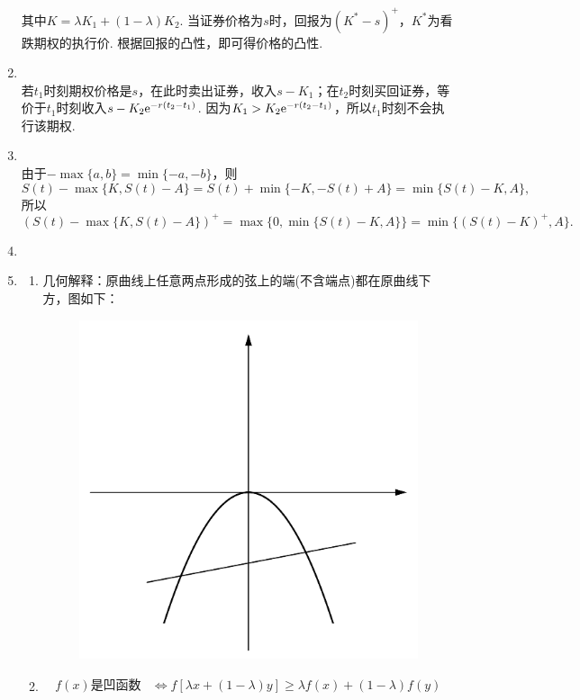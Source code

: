 \begin{enumerate}[label=\arabic{section}.\arabic*]
    其中$K=\lambda K_1+(1-\lambda)K_2$. 当证券价格为$s$时，回报为$(K^*-s)^+$，$K^*$为看跌期权的执行价. 根据回报的凸性，即可得价格的凸性.
    \item \pro\\
    若$t_1$时刻期权价格是$s$，在此时卖出证券，收入$s-K_1$；在$t_2$时刻买回证券，等价于$t_1$时刻收入$s-K_2\mathrm{e}^{-r(t_2-t_1)}$. 因为$K_1>K_2\mathrm{e}^{-r(t_2-t_1)}$，所以$t_1$时刻不会执行该期权.
    \item \pro\\
    由于$-\max\{a,b\}=\min\{-a,-b\}$，则
    \[S(t)-\max\{K,S(t)-A\}=S(t)+\min\{-K,-S(t)+A\}=\min\{S(t)-K,A\},\]
    所以\[(S(t)-\max\{K,S(t)-A\})^+=\max\{0,\min\{S(t)-K,A\}\}=\min\{(S(t)-K)^+,A\}.\]
    \item \omitted
    \item \sol
    \begin{enumerate}[label=\alph*)]
        \item 几何解释：原曲线上任意两点形成的弦上的端(不含端点)都在原曲线下方，图如下：
        \begin{figure}[H]
            \centering
            \includegraphics[scale=0.2]{5.28.pdf}
        \end{figure}
        \item \begin{align*}
            f(x)\text{是凹函数} & \iff f[\lambda x+(1-\lambda)y] \geq \lambda f(x)+(1-\lambda)f(y)\\

\end{align*}
\end{enumerate}
\end{enumerate}
